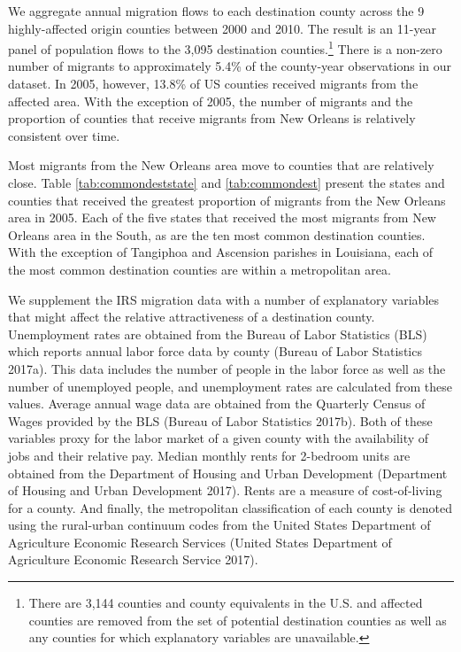 \documentclass[]{article}
\let\rmarkdownfootnote\footnote%
\def\footnote{\protect\rmarkdownfootnote}
\begin{document}
We aggregate annual migration flows to each destination county across
the 9 highly-affected origin counties between 2000 and 2010. The result
is an 11-year panel of population flows to the 3,095 destination
counties.\footnote{There are 3,144 counties and county equivalents in
  the U.S. and affected counties are removed from the set of potential
  destination counties as well as any counties for which explanatory
  variables are unavailable.} There is a non-zero number of migrants to
approximately 5.4\% of the county-year observations in our dataset. In
2005, however, 13.8\% of US counties received migrants from the affected
area. With the exception of 2005, the number of migrants and the
proportion of counties that receive migrants from New Orleans is
relatively consistent over time.

Most migrants from the New Orleans area move to counties that are
relatively close. Table \ref{tab:commondeststate} and
\ref{tab:commondest} present the states and counties that received the
greatest proportion of migrants from the New Orleans area in 2005. Each
of the five states that received the most migrants from New Orleans area
in the South, as are the ten most common destination counties. With the
exception of Tangiphoa and Ascension parishes in Louisiana, each of the
most common destination counties are within a metropolitan area.

We supplement the IRS migration data with a number of explanatory
variables that might affect the relative attractiveness of a destination
county. Unemployment rates are obtained from the Bureau of Labor
Statistics (BLS) which reports annual labor force data by county (Bureau
of Labor Statistics 2017a). This data includes the number of people in
the labor force as well as the number of unemployed people, and
unemployment rates are calculated from these values. Average annual wage
data are obtained from the Quarterly Census of Wages provided by the BLS
(Bureau of Labor Statistics 2017b). Both of these variables proxy for
the labor market of a given county with the availability of jobs and
their relative pay. Median monthly rents for 2-bedroom units are
obtained from the Department of Housing and Urban Development
(Department of Housing and Urban Development 2017). Rents are a measure
of cost-of-living for a county. And finally, the metropolitan
classification of each county is denoted using the rural-urban continuum
codes from the United States Department of Agriculture Economic Research
Services (United States Department of Agriculture Economic Research
Service 2017).
\end{document}
